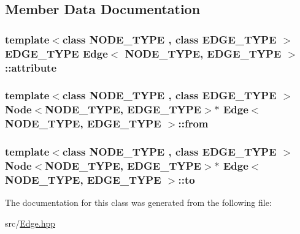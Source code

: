 \subsection{Member Data Documentation}
\hypertarget{class_edge_ae49cc056dfa848b0a1beef821d81a31d}{
\subsubsection[{attribute}]{\setlength{\rightskip}{0pt plus 5cm}template$<$class N\+O\+D\+E\+\_\+\+T\+Y\+P\+E , class E\+D\+G\+E\+\_\+\+T\+Y\+P\+E $>$ E\+D\+G\+E\+\_\+\+T\+Y\+P\+E {\bf Edge}$<$ N\+O\+D\+E\+\_\+\+T\+Y\+P\+E, E\+D\+G\+E\+\_\+\+T\+Y\+P\+E $>$\+::attribute\hspace{0.3cm}{\ttfamily [private]}}}\label{class_edge_ae49cc056dfa848b0a1beef821d81a31d}
\hypertarget{class_edge_a1bffa41df2941b7d55c59a5031f78e14}{
\subsubsection[{from}]{\setlength{\rightskip}{0pt plus 5cm}template$<$class N\+O\+D\+E\+\_\+\+T\+Y\+P\+E , class E\+D\+G\+E\+\_\+\+T\+Y\+P\+E $>$ {\bf Node}$<$N\+O\+D\+E\+\_\+\+T\+Y\+P\+E, E\+D\+G\+E\+\_\+\+T\+Y\+P\+E$>$$\ast$ {\bf Edge}$<$ N\+O\+D\+E\+\_\+\+T\+Y\+P\+E, E\+D\+G\+E\+\_\+\+T\+Y\+P\+E $>$\+::from\hspace{0.3cm}{\ttfamily [private]}}}\label{class_edge_a1bffa41df2941b7d55c59a5031f78e14}
\hypertarget{class_edge_a7ba6dee1554e4a0a7cf69862e90fdd85}{
\subsubsection[{to}]{\setlength{\rightskip}{0pt plus 5cm}template$<$class N\+O\+D\+E\+\_\+\+T\+Y\+P\+E , class E\+D\+G\+E\+\_\+\+T\+Y\+P\+E $>$ {\bf Node}$<$N\+O\+D\+E\+\_\+\+T\+Y\+P\+E, E\+D\+G\+E\+\_\+\+T\+Y\+P\+E$>$$\ast$ {\bf Edge}$<$ N\+O\+D\+E\+\_\+\+T\+Y\+P\+E, E\+D\+G\+E\+\_\+\+T\+Y\+P\+E $>$\+::to\hspace{0.3cm}{\ttfamily [private]}}}\label{class_edge_a7ba6dee1554e4a0a7cf69862e90fdd85}


The documentation for this class was generated from the following file\+:\begin{DoxyCompactItemize}
\item 
src/\hyperlink{_edge_8hpp}{Edge.\+hpp}\end{DoxyCompactItemize}

